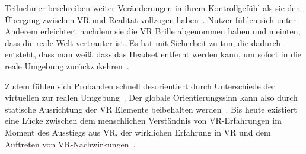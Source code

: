 Teilnehmer beschreiben weiter Veränderungen in ihrem Kontrollgefühl als sie den Übergang zwischen VR und Realität vollzogen haben~\cite{knibbe2018dream}. 
Nutzer fühlen sich unter Anderem erleichtert nachdem sie die VR Brille abgenommen haben und meinten, dass die reale Welt vertrauter ist. 
Es hat mit Sicherheit zu tun, die dadurch entsteht, dass man weiß, dass das Headset entfernt werden kann, um sofort in die reale Umgebung zurückzukehren~\cite{knibbe2018dream}.

Zudem fühlen sich Probanden schnell desorientiert durch Unterschiede der virtuellen zur realen Umgebung~\cite{knibbe2018dream}. Der globale Orientierungssinn kann also durch statische Ausrichtung der VR Elemente beibehalten werden~\cite{knibbe2018dream}.
Bis heute existiert eine Lücke zwischen dem menschlichen Verständnis von VR-Erfahrungen im Moment des Ausstiegs aus VR, der wirklichen Erfahrung in VR und dem Auftreten von VR-Nachwirkungen~\cite{knibbe2018dream}.

